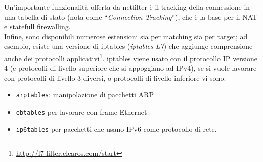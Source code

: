 Un'importante funzionalità offerta da netfilter è il tracking della connessione
in una tabella di stato (nota come ``\textit{Connection Tracking}''), che è la base
per il NAT e statefull firewalling.\\
Infine, sono disponibili numerose estensioni sia per matching sia per target;
ad esempio, esiste una versione di iptables
(\textit{iptables L7}) che aggiunge comprensione anche dei protocolli
applicativi\footnote{\url{http://l7-filter.clearos.com/start}}.
iptables viene usato con il protocollo IP versione 4 (e protocolli di livello
superiore che si appoggiano ad IPv4), se si vuole lavorare con protocolli
di livello 3 diversi, o protocolli di livello inferiore vi sono:
\begin{itemize}
  \item \texttt{arptables}: manipolazione di pacchetti ARP
  \item \texttt{ebtables} per lavorare con frame Ethernet
  \item \texttt{ip6tables} per pacchetti che usano IPv6 come protocollo di rete.
\end{itemize}
